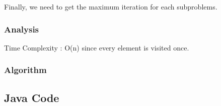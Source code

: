 \documentclass[]{book}
\begin{document}
Finally, we need to get the maximum iteration for each subproblems.

\hypertarget{analysis-25}{%
\subsubsection{Analysis}\label{analysis-25}}

Time Complexity : O(n) since every element is visited once.

\hypertarget{algorithm-25}{%
\subsubsection{Algorithm}\label{algorithm-25}}

\hypertarget{java-code-21}{%
\subsection{Java Code}\label{java-code-21}}
\end{document}
